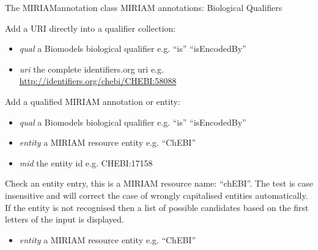 \documentclass[a4paper,11pt,english]{sphinxmanual}
\begin{document}
\begin{fulllineitems}
\label{modules_doc:cbmpy.CBDataStruct.MIRIAMannotation}
The MIRIAMannotation class MIRIAM annotations: Biological Qualifiers

\begin{fulllineitems}
\label{modules_doc:cbmpy.CBDataStruct.MIRIAMannotation.addIDorgURI}
Add a URI directly into a qualifier collection:
\begin{itemize}
\item {} 
\emph{qual} a Biomodels biological qualifier e.g. ``is'' ``isEncodedBy''

\item {} 
\emph{uri} the complete identifiers.org uri e.g. \url{http://identifiers.org/chebi/CHEBI:58088}

\end{itemize}

\end{fulllineitems}


\begin{fulllineitems}
\label{modules_doc:cbmpy.CBDataStruct.MIRIAMannotation.addMIRIAMannotation}
Add a qualified MIRIAM annotation or entity:
\begin{itemize}
\item {} 
\emph{qual} a Biomodels biological qualifier e.g. ``is'' ``isEncodedBy''

\item {} 
\emph{entity} a MIRIAM resource entity e.g. ``ChEBI''

\item {} 
\emph{mid} the entity id e.g. CHEBI:17158

\end{itemize}

\end{fulllineitems}


\begin{fulllineitems}
\label{modules_doc:cbmpy.CBDataStruct.MIRIAMannotation.checkEntity}
Check an entity entry, this is a MIRIAM resource name: ``chEBI''. The test is case insensitive and will correct the case
of wrongly capitalised entities automatically. If the entity is not recognised then a list of possible candidates
based on the first letters of the input is displayed.
\begin{itemize}
\item {} 
\emph{entity} a MIRIAM resource entity e.g. ``ChEBI''


\end{itemize}
\end{fulllineitems}
\end{fulllineitems}
\end{document}
